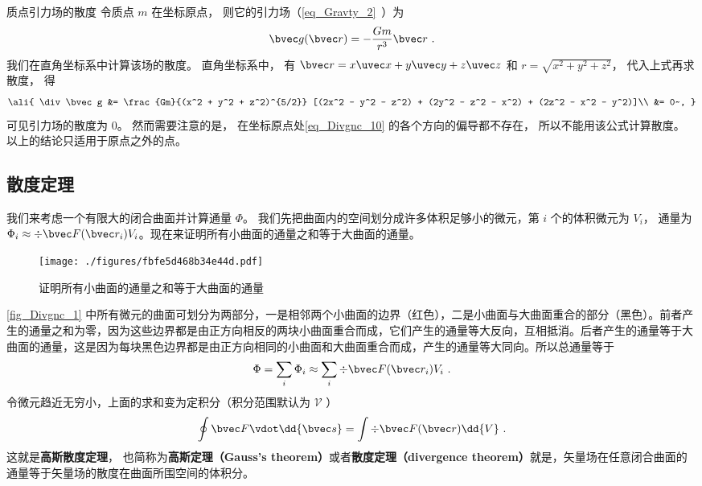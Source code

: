 \begin{example}{质点引力场的散度}
令质点 $m$ 在坐标原点， 则它的引力场（\autoref{eq_Gravty_2}~）为
\begin{equation}\label{eq_Divgnc_10}
\bvec g(\bvec r) = -\frac{Gm}{r^3}\bvec r~.
\end{equation}
我们在直角坐标系中计算该场的散度。 直角坐标系中， 有 $\bvec r = x\uvec x + y\uvec y + z\uvec z$ 和 $r = \sqrt{x^2 + y^2 + z^2}$， 代入上式再求散度， 得
\begin{equation}\ali{
\div \bvec g &= \frac{Gm}{(x^2 + y^2 + z^2)^{5/2}} [(2x^2 - y^2 - z^2) + (2y^2 - z^2 - x^2) + (2z^2 - x^2 - y^2)]\\
&= 0~,
}\end{equation}
可见引力场的散度为 0。 然而需要注意的是， 在坐标原点处\autoref{eq_Divgnc_10} 的各个方向的偏导都不存在， 所以不能用该公式计算散度。 以上的结论只适用于原点之外的点。
\end{example}


\subsection{散度定理}

我们来考虑一个有限大的闭合曲面并计算通量 $\Phi$。 我们先把曲面内的空间划分成许多体积足够小的微元，第 $i$ 个的体积微元为 $V_i$， 通量为 $\Phi_i \approx \div \bvec F(\bvec r_i) V_i$。现在来证明所有小曲面的通量之和等于大曲面的通量。
\begin{figure}[ht]
\centering
\texttt{[image: ./figures/fbfe5d468b34e44d.pdf]}
\caption{证明所有小曲面的通量之和等于大曲面的通量} \label{fig_Divgnc_1}
\end{figure}
\autoref{fig_Divgnc_1} 中所有微元的曲面可划分为两部分，一是相邻两个小曲面的边界（红色），二是小曲面与大曲面重合的部分（黑色）。前者产生的通量之和为零，因为这些边界都是由正方向相反的两块小曲面重合而成，它们产生的通量等大反向，互相抵消。后者产生的通量等于大曲面的通量，这是因为每块黑色边界都是由正方向相同的小曲面和大曲面重合而成，产生的通量等大同向。所以总通量等于
\begin{equation}
\Phi  = \sum_i \Phi_i  \approx \sum_i \div \bvec F (\bvec r_i) V_i~.
\end{equation}
令微元趋近无穷小，上面的求和变为定积分（积分范围默认为 $\mathcal V$ ）
\begin{equation}\label{eq_Divgnc_13}
\oint \bvec F \vdot \dd{\bvec s} = \int \div \bvec F(\bvec r) \dd{V}~.
\end{equation}
这就是\textbf{高斯散度定理}， 也简称为\textbf{高斯定理（Gauss's theorem）}或者\textbf{散度定理（divergence theorem）}就是，矢量场在任意闭合曲面的通量等于矢量场的散度在曲面所围空间的体积分。

